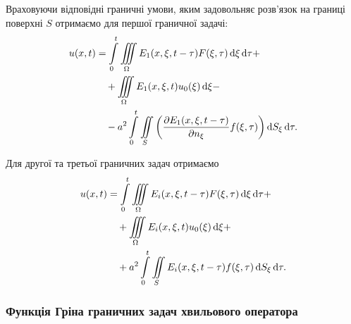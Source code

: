 Враховуючи відповідні граничні умови, яким задовольняє розв'язок на границі поверхні $S$ отримаємо для першої граничної задачі:
\begin{equation}
	\begin{aligned}
		u(x, t) &= \displaystyle\int\limits_0^t \displaystyle\iiint\limits_\Omega E_1(x, \xi, t - \tau) F(\xi, \tau) \mathop{}\!\mathrm{d} \xi \mathop{}\!\mathrm{d} \tau + \\
		& \quad + \displaystyle\iiint\limits_\Omega E_1(x, \xi, t) u_0(\xi) \mathop{}\!\mathrm{d} \xi - \\
		& \quad - a^2 \displaystyle\int\limits_0^t \displaystyle\iint\limits_S \left( \frac{\partial E_1(x, \xi, t - \tau)}{\partial n_\xi} f(\xi, \tau)\right) \mathop{}\!\mathrm{d} S_\xi \mathop{}\!\mathrm{d} \tau.
	\end{aligned}
\end{equation}

Для другої та третьої граничних задач отримаємо 
\begin{equation}
	\begin{aligned}
		u(x, t) &= \displaystyle\int\limits_0^t \displaystyle\iiint\limits_\Omega E_i(x, \xi, t - \tau) F(\xi, \tau) \mathop{}\!\mathrm{d} \xi \mathop{}\!\mathrm{d} \tau + \\
		& \quad + \displaystyle\iiint\limits_\Omega E_i(x, \xi, t) u_0(\xi) \mathop{}\!\mathrm{d} \xi + \\
		& \quad + a^2 \displaystyle\int\limits_0^t \displaystyle\iint\limits_S E_i(x, \xi, t - \tau) f(\xi, \tau) \mathop{}\!\mathrm{d} S_\xi \mathop{}\!\mathrm{d} \tau.
	\end{aligned}
\end{equation}

\subsubsection{Функція Гріна граничних задач хвильового оператора}

